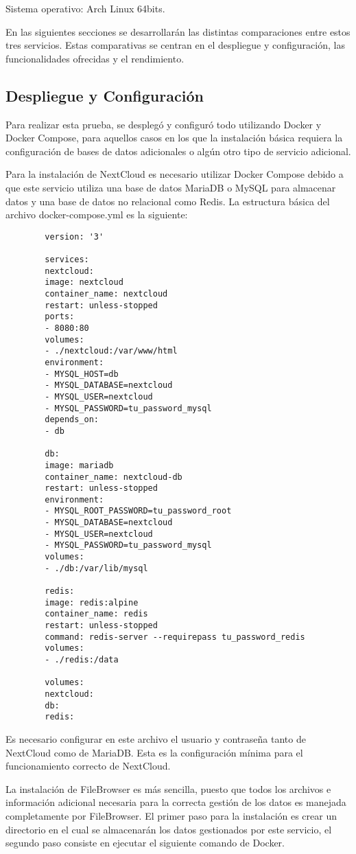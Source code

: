 \documentclass[a4paper,10pt]{article}
\begin{document}
	Sistema operativo: Arch Linux 64bits.
	
	En las siguientes secciones se desarrollarán las distintas comparaciones entre estos tres servicios. Estas comparativas se centran en el despliegue y configuración, las funcionalidades ofrecidas y el rendimiento.
	
	\subsection{Despliegue y Configuración}
	Para realizar esta prueba, se desplegó y configuró todo utilizando Docker y Docker Compose, para aquellos casos en los que la instalación básica requiera la configuración de bases de datos adicionales o algún otro tipo de servicio adicional.
	
	Para la instalación de NextCloud es necesario utilizar Docker Compose debido a que este servicio utiliza una base de datos MariaDB o MySQL para almacenar datos y una base de datos no relacional como Redis. La estructura básica del archivo docker-compose.yml es la siguiente:
	
	\begin{verbatim}
		version: '3'
		
		services:
		nextcloud:
		image: nextcloud
		container_name: nextcloud
		restart: unless-stopped
		ports:
		- 8080:80
		volumes:
		- ./nextcloud:/var/www/html
		environment:
		- MYSQL_HOST=db
		- MYSQL_DATABASE=nextcloud
		- MYSQL_USER=nextcloud
		- MYSQL_PASSWORD=tu_password_mysql
		depends_on:
		- db
		
		db:
		image: mariadb
		container_name: nextcloud-db
		restart: unless-stopped
		environment:
		- MYSQL_ROOT_PASSWORD=tu_password_root
		- MYSQL_DATABASE=nextcloud
		- MYSQL_USER=nextcloud
		- MYSQL_PASSWORD=tu_password_mysql
		volumes:
		- ./db:/var/lib/mysql
		
		redis:
		image: redis:alpine
		container_name: redis
		restart: unless-stopped
		command: redis-server --requirepass tu_password_redis
		volumes:
		- ./redis:/data
		
		volumes:
		nextcloud:
		db:
		redis:
	\end{verbatim}
	
	Es necesario configurar en este archivo el usuario y contraseña tanto de NextCloud como de MariaDB. Esta es la configuración mínima para el funcionamiento correcto de NextCloud.
	
	La instalación de FileBrowser es más sencilla, puesto que todos los archivos e información adicional necesaria para la correcta gestión de los datos es manejada completamente por FileBrowser. El primer paso para la instalación es crear un directorio en el cual se almacenarán los datos gestionados por este servicio, el segundo paso consiste en ejecutar el siguiente comando de Docker.
	
\end{document}

